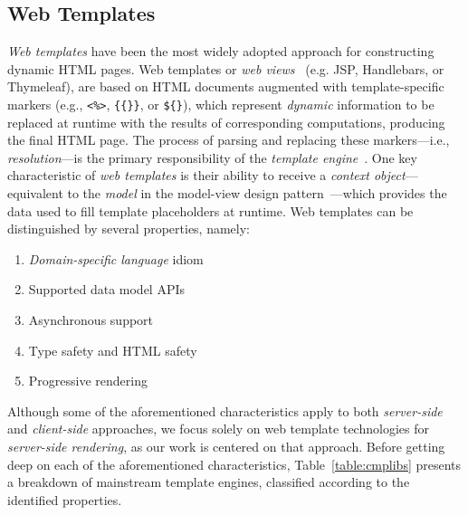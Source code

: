 \subsection{Web Templates}

\textit{Web templates} have been the most widely adopted approach for
constructing dynamic HTML pages.
Web templates or \textit{web views}~\cite{Fowler02,Alur01} (e.g. JSP, Handlebars,
or Thymeleaf), are based on HTML documents augmented with template-specific
markers (e.g., \texttt{<\%>}, \texttt{\{\{\}\}}, or \texttt{\$\{\}}), which
represent \textit{dynamic} information to be replaced at runtime with the
results of corresponding computations, producing the final HTML page.
The process of parsing and replacing these markers---i.e.,
\textit{resolution}---is the primary responsibility of the \textit{template
  engine}~\cite{Parr04}.
One key characteristic of \textit{web templates} is their ability to receive a
\textit{context object}---equivalent to the \textit{model} in the model-view
design pattern~\cite{mvc88,Parr04}---which provides the data used to fill
template placeholders at runtime.
Web templates can be distinguished by several properties, namely:
\begin{enumerate}
  \item \textit{Domain-specific language} idiom
  \item Supported data model APIs
  \item Asynchronous support
  \item Type safety and HTML safety
  \item Progressive rendering
\end{enumerate}

Although some of the aforementioned characteristics apply to both
\textit{server-side} and \textit{client-side} approaches, we focus solely on
web template technologies for \textit{server-side rendering}, as our work is
centered on that approach. Before getting deep on each of the aforementioned
characteristics, Table~\ref{table:cmplibs} presents a breakdown of mainstream
template engines, classified according to the identified properties.

